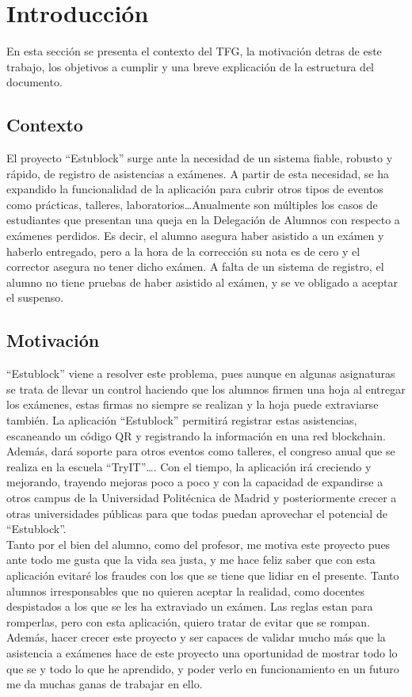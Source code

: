 \chapter{Introducción}
\label{cap:Introduccion}

En esta sección se presenta el contexto del TFG, la motivación detras de este trabajo, los objetivos a cumplir y una breve explicación de la estructura del documento.

\section{Contexto}

El proyecto ``Estublock'' surge ante la necesidad de un sistema fiable, robusto y rápido, de registro de asistencias a exámenes. A partir de esta necesidad, se ha expandido la funcionalidad de la aplicación para cubrir otros tipos de eventos como prácticas, talleres, laboratorios\dots Anualmente son múltiples los casos de estudiantes que presentan una queja en la Delegación de Alumnos con respecto a exámenes perdidos. Es decir, el alumno asegura haber asistido a un exámen y haberlo entregado, pero a la hora de la corrección su nota es de cero y el corrector asegura no tener dicho exámen. A falta de un sistema de registro, el alumno no tiene pruebas de haber asistido al exámen, y se ve obligado a aceptar el suspenso.

\section{Motivación}

``Estublock'' viene a resolver este problema, pues aunque en algunas asignaturas se trata de llevar un control haciendo que los alumnos firmen una hoja al entregar los exámenes, estas firmas no siempre se realizan y la hoja puede extraviarse también. La aplicación ``Estublock'' permitirá registrar estas asistencias, escaneando un código QR y registrando la información en una red blockchain. Además, dará soporte para otros eventos como talleres, el congreso anual que se realiza en la escuela ``TryIT''\dots. Con el tiempo, la aplicación irá creciendo y mejorando, trayendo mejoras poco a poco y con la capacidad de expandirse a otros campus de la Universidad Politécnica de Madrid y posteriormente crecer a otras universidades públicas para que todas puedan aprovechar el potencial de ``Estublock''. \\

Tanto por el bien del alumno, como del profesor, me motiva este proyecto pues ante todo me gusta que la vida sea justa, y me hace feliz saber que con esta aplicación evitaré los fraudes con los que se tiene que lidiar en el presente. Tanto alumnos irresponsables que no quieren aceptar la realidad, como docentes despistados a los que se les ha extraviado un exámen. Las reglas estan para romperlas, pero con esta aplicación, quiero tratar de evitar que se rompan. Además, hacer crecer este proyecto y ser capaces de validar mucho más que la asistencia a exámenes hace de este proyecto una oportunidad de mostrar todo lo que se y todo lo que he aprendido, y poder verlo en funcionamiento en un futuro me da muchas ganas de trabajar en ello. \\

